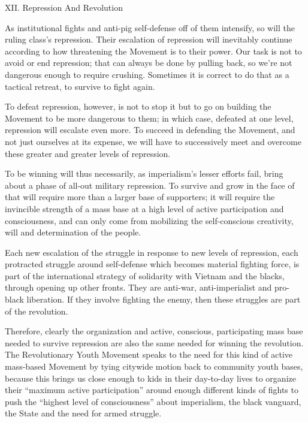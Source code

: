 \documentclass[12pt, titlepage]{article}
\begin{document}
{\begin{spacing}{1.10}
\begin{center}
XII. Repression And Revolution
\end{center}

As institutional fights and anti-pig self-defense off of them intensify, so will the ruling class's repression. Their escalation of repression will inevitably continue according to how threatening the Movement is to their power. Our task is not to avoid or end repression; that can always be done by pulling back, so we're not dangerous enough to require crushing. Sometimes it is correct to do that as a tactical retreat, to survive to fight again.

To defeat repression, however, is not to stop it but to go on building the Movement to be more dangerous to them; in which case, defeated at one level, repression will escalate even more. To succeed in defending the Movement, and not just ourselves at its expense, we will have to successively meet and overcome these greater and greater levels of repression.

To be winning will thus necessarily, as imperialism's lesser efforts fail, bring about a phase of all-out military repression. To survive and grow in the face of that will require more than a larger base of supporters; it will require the invincible strength of a mass base at a high level of active participation and consciousness, and can only come from mobilizing the self-conscious creativity, will and determination of the people.

Each new escalation of the struggle in response to new levels of repression, each protracted struggle around self-defense which becomes material fighting force, is part of the international strategy of solidarity with Vietnam and the blacks, through opening up other fronts. They are anti-war, anti-imperialist and pro-black liberation. If they involve fighting the enemy, then these struggles are part of the revolution.

Therefore, clearly the organization and active, conscious, participating mass base needed to survive repression are also the same needed for winning the revolution. The Revolutionary Youth Movement speaks to the need for this kind of active mass-based Movement by tying citywide motion back to community youth bases, because this brings us close enough to kids in their day-to-day lives to organize their ``maximum active participation'' around enough different kinds of fights to push the ``highest level of consciousness'' about imperialism, the black vanguard, the State and the need for armed struggle.


\end{spacing}}
\end{document}
